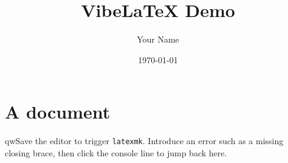 \documentclass{article}
\title{VibeLaTeX Demo}
\author{Your Name}
\date{\today}
\begin{document}
\maketitle

\section{A document}





qwSave the editor to trigger \texttt{latexmk}. Introduce an error such as a
missing closing brace, then click the console line to jump back here.



\end{document}
